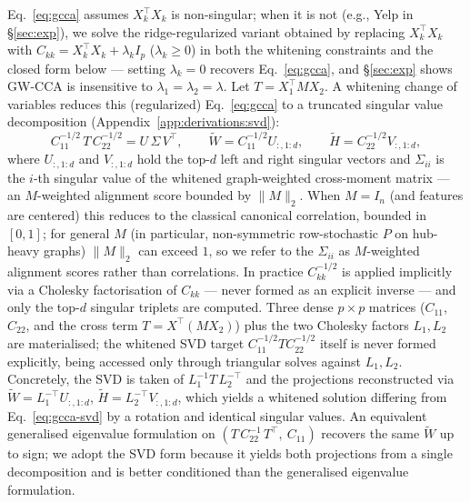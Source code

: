 \documentclass{article}
\begin{document}
Eq.~\ref{eq:gcca} assumes $X_k^\top X_k$ is non-singular; when it is not
(e.g., Yelp in \S\ref{sec:exp}), we solve the ridge-regularized variant
obtained by replacing $X_k^\top X_k$ with
$C_{kk} = X_k^\top X_k + \lambda_k I_p$ ($\lambda_k \geq 0$) in both the
whitening constraints and the closed form below --- setting $\lambda_k = 0$
recovers Eq.~\ref{eq:gcca}, and \S\ref{sec:exp} shows GW-CCA is insensitive
to $\lambda_1 = \lambda_2 = \lambda$. Let $T = X_1^\top M X_2$. A whitening
change of variables reduces this (regularized) Eq.~\ref{eq:gcca} to a
truncated singular value decomposition (Appendix~\ref{app:derivations:svd}):
\begin{equation}\label{eq:gcca-svd}
C_{11}^{-1/2}\, T\, C_{22}^{-1/2} = U\, \Sigma\, V^\top,
\qquad
\widetilde{W} = C_{11}^{-1/2} U_{:,1:d},
\qquad
\widetilde{H} = C_{22}^{-1/2} V_{:,1:d},
\end{equation}
where $U_{:,1:d}$ and $V_{:,1:d}$ hold the top-$d$ left and right singular
vectors and $\Sigma_{ii}$ is the $i$-th singular value of the whitened
graph-weighted cross-moment matrix --- an $M$-weighted alignment score
bounded by $\|M\|_2$. When $M = I_n$ (and features are centered) this
reduces to the classical canonical correlation, bounded in $[0, 1]$; for
general $M$ (in particular, non-symmetric row-stochastic $P$ on hub-heavy
graphs) $\|M\|_2$ can exceed $1$, so we refer to the $\Sigma_{ii}$ as
$M$-weighted alignment scores rather than correlations. In practice
$C_{kk}^{-1/2}$ is applied implicitly via a Cholesky factorisation of
$C_{kk}$ --- never formed as an explicit inverse --- and only the top-$d$
singular triplets are computed. Three dense $p \times p$ matrices
($C_{11}$, $C_{22}$, and the cross term $T = X^\top(MX_2)$) plus the two
Cholesky factors $L_1, L_2$ are materialised; the whitened SVD target
$C_{11}^{-1/2} T C_{22}^{-1/2}$ itself is never formed explicitly, being
accessed only through triangular solves against $L_1, L_2$.
Concretely, the SVD is taken of $L_1^{-1} T\, L_2^{-\top}$ and the
projections reconstructed via $\widetilde{W} = L_1^{-\top} U_{:,1:d}$,
$\widetilde{H} = L_2^{-\top} V_{:,1:d}$, which yields a whitened solution
differing from Eq.~\ref{eq:gcca-svd} by a rotation and identical
singular values. An equivalent generalised eigenvalue
formulation on $(T\, C_{22}^{-1}\, T^\top,\ C_{11})$ recovers the same
$\widetilde{W}$ up to sign; we adopt the SVD form because it yields both
projections from a single decomposition and is better conditioned than
the generalised eigenvalue formulation.
\end{document}
